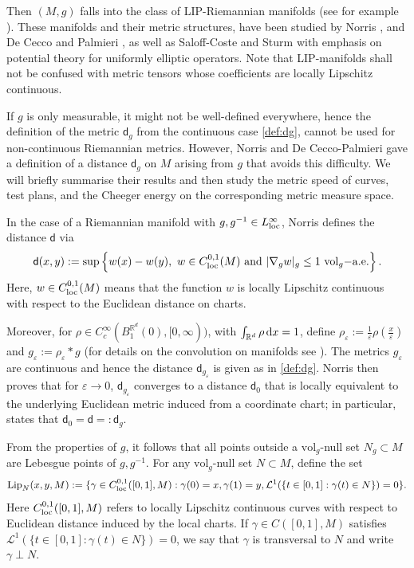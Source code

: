 \documentclass[a4paper,10pt]{article}
\numberwithin{equation}{section}
\newcommand{\R}{\mathbb{R}}
\newcommand{\e}{\varepsilon}
\newcommand{\vol}{\mathrm{vol}}
\newcommand{\sfd}{\mathsf d}
\newcommand{\di}{{\rm d}}
\begin{document}
Then $(M, g)$ falls into the class of LIP-Riemannian manifolds (see for example \cite{teleman1983index, de1991integral}). These manifolds and their metric structures, have been studied by Norris \cite{norris1997heat}, and De Cecco and Palmieri  \cite{de1991integral}, as well as  Saloff-Coste  \cite{saloff1992uniformly} and Sturm  \cite{sturm1995analysis} with emphasis on potential theory for uniformly elliptic operators. 
Note that LIP-manifolds shall not be confused with metric tensors whose coefficients are locally Lipschitz continuous.

If $g$ is only measurable, it might not be well-defined everywhere, hence the definition of the metric $\sfd_g$ from the continuous case \eqref{def:dg}, cannot be used for non-continuous Riemannian metrics. 
However, Norris \cite{norris1997heat} and De Cecco-Palmieri \cite{de1991integral} gave a definition of a distance $\sfd_g$ on $M$ arising from $g$ that avoids this difficulty. We will briefly summarise their results and then study the metric speed of curves, test plans, and the Cheeger energy on the corresponding metric measure space. 

In the case of a Riemannian manifold with $g, g^{-1}\in L^\infty_{\rm loc}$, Norris defines the distance $\sfd$ via
 \begin{align*}
     \sfd(x,y) := \sup \left\{  w(x)-w(y)  ,\ w \in C^{0,1}_{\rm loc}(M)\ \mathrm{and}\ |\nabla_g w|_g\leq 1\ \vol_g\mathrm{-a.e. } \right\}.
 \end{align*}
Here, $w \in C^{0,1}_{\rm loc}(M)$ means that the function $w$ is locally Lipschitz continuous with respect to the Euclidean distance on charts.
 
 Moreover, for $\rho\in C_c^\infty(B_1^{\R^d}(0), [0,\infty))$, with $\int_{\R^d} \rho\, \di x =1$, define $\rho_\e := \frac{1}{\e}\rho(\frac{x}{\e})$ and $g_\e := \rho_\e * g$ (for details on the convolution on manifolds see \cite{grosser2013geometric, graf2020singularity}). The metrics $g_\e$ are continuous and hence the distance $\sfd_{g_\e}$ is given as in \eqref{def:dg}. Norris then proves that for $\e \to 0$, $\sfd_{g_\e}$ converges to a distance $\sfd_0$ that is locally equivalent to the underlying Euclidean metric induced from a coordinate chart; in particular,  \cite[Theorem 3.6]{norris1997heat} states that $\sfd_0 = \sfd =: \sfd_g$. 

 From the properties of $g$, it follows that all points outside a $\vol_g$-null set $N_g \subset M$ are Lebesgue points of $g, g^{-1}$. For any $\vol_g$-null set $N \subset M$, define the set 
 \begin{align}
     \mathrm{Lip}_N(x, y, M):= \{\gamma \in C^{0,1}_{\rm{loc}}([0,1], M): \gamma(0)=x, \gamma(1)=y, \mathcal{L}^1(\{t \in [0,1]: \gamma(t) \in N\}) =0\}.
 \end{align}
 Here $C^{0,1}_{\rm loc}([0,1], M)$ refers to locally Lipschitz continuous curves with respect to Euclidean distance induced by the local charts. 
 If $\gamma \in C([0,1], M)$ satisfies $\mathcal{L}^1(\{t \in [0,1]: \gamma(t) \in N\}) =0$, we say that $\gamma$ is transversal to $N$ and write $\gamma \perp N$.
\end{document}

